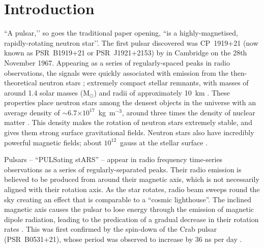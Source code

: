 \chapter{Introduction}
\label{chapt: intro}

``A pulsar,’’ so goes the traditional paper opening, ``is a highly-magnetised, rapidly-rotating neutron star’’. The first pulsar discovered was CP~1919+21 (now known as PSR~B1919+21 or PSR~J1921+2153) by \citet{HBP+1968} in Cambridge on the 28th November 1967. Appearing as a series of regularly-spaced peaks in radio observations, the signals were quickly associated with emission from the then-theoretical neutron stars \citep{BZxx1934}; extremely compact stellar remnants, with masses of around 1.4 solar masses (M$_\odot$) and radii of approximately 10~km \citep[e.g.][]{PulsarAstronomy}. These properties place neutron stars among the densest objects in the universe with an average density of $\sim$6.7$\times10^{17}$~kg~m$^{-3}$, around three times the density of nuclear matter \citep[$2.3\times10^{17}$~kg~m$^{-3}$; e.g.][]{Lxxx2001}. This density makes the rotation of neutron stars extremely stable, and gives them strong surface gravitational fields. Neutron stars also have incredibly powerful magnetic fields; about $10^{12}$~gauss at the stellar surface \citep{Gxxx1968}.

Pulsars -- ``PULSating stARS'' -- appear in radio frequency time-series observations as a series of regularly-separated peaks. Their radio emission is believed to be produced from around their magnetic axis, which is not necessarily aligned with their rotation axis. As the star rotates, radio beam sweeps round the sky creating an effect that is comparable to a ``cosmic lighthouse''. The inclined magnetic axis causes the pulsar to lose energy through the emission of magnetic dipole radiation, leading to the predication of a gradual decrease in their rotation rates \citep{Pxxx1968}. This was first confirmed by the spin-down of the Crab pulsar (PSR~B0531+21), whose period was observed to increase by 36 ns per day \citep{RCxx1969_crab}.

